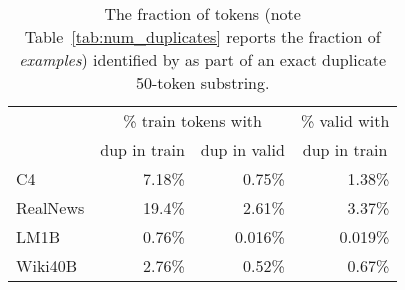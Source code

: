 \begin{table}[]
  \centering
  \small
  \caption{The fraction of tokens  (note Table~\ref{tab:num_duplicates} reports the fraction of \emph{examples}) identified by \Exact{} as part of an exact duplicate 50-token substring.}
    \begin{tabular}{l|rr|r}
    \toprule
          & \multicolumn{2}{c}{\% train tokens with} & \multicolumn{1}{c}{\% valid with} \\
          & \multicolumn{1}{c}{dup in train} & \multicolumn{1}{c}{dup in valid} & \multicolumn{1}{c}{dup in train} \\
          \midrule
    C4    & 7.18\% & 0.75\%  & 1.38\% \\
    RealNews & 19.4\%  & 2.61\%  & 3.37\% \\
    LM1B  & 0.76\%  & 0.016\%  & 0.019\% \\
    Wiki40B & 2.76\%  & 0.52\%  & 0.67\% \\
    \bottomrule
    \end{tabular}%
\end{table}%